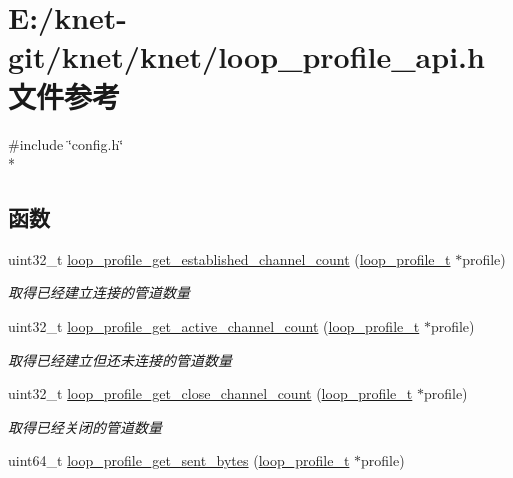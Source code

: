 \hypertarget{a00079}{}\section{E\+:/knet-\/git/knet/knet/loop\+\_\+profile\+\_\+api.h 文件参考}
\label{a00079}
{\ttfamily \#include \char`\"{}config.\+h\char`\"{}}\\*
\subsection*{函数}
\begin{DoxyCompactItemize}
\item 
uint32\+\_\+t \hyperlink{a00079_a45226aca5f27c8d49cc7b405409fc958_a45226aca5f27c8d49cc7b405409fc958}{loop\+\_\+profile\+\_\+get\+\_\+established\+\_\+channel\+\_\+count} (\hyperlink{a00050_ad060e1396346d2f5db1ec0597376a107_ad060e1396346d2f5db1ec0597376a107}{loop\+\_\+profile\+\_\+t} $\ast$profile)
\begin{DoxyCompactList}\small\item\em 取得已经建立连接的管道数量 \end{DoxyCompactList}\item 
uint32\+\_\+t \hyperlink{a00079_a25e7659843c550c5d2147286ad1b48ae_a25e7659843c550c5d2147286ad1b48ae}{loop\+\_\+profile\+\_\+get\+\_\+active\+\_\+channel\+\_\+count} (\hyperlink{a00050_ad060e1396346d2f5db1ec0597376a107_ad060e1396346d2f5db1ec0597376a107}{loop\+\_\+profile\+\_\+t} $\ast$profile)
\begin{DoxyCompactList}\small\item\em 取得已经建立但还未连接的管道数量 \end{DoxyCompactList}\item 
uint32\+\_\+t \hyperlink{a00079_a5fd58f572ac680a32930d275c5854e8e_a5fd58f572ac680a32930d275c5854e8e}{loop\+\_\+profile\+\_\+get\+\_\+close\+\_\+channel\+\_\+count} (\hyperlink{a00050_ad060e1396346d2f5db1ec0597376a107_ad060e1396346d2f5db1ec0597376a107}{loop\+\_\+profile\+\_\+t} $\ast$profile)
\begin{DoxyCompactList}\small\item\em 取得已经关闭的管道数量 \end{DoxyCompactList}\item 
uint64\+\_\+t \hyperlink{a00079_ad8eec173abe7c0e50137b6ac74c2c817_ad8eec173abe7c0e50137b6ac74c2c817}{loop\+\_\+profile\+\_\+get\+\_\+sent\+\_\+bytes} (\hyperlink{a00050_ad060e1396346d2f5db1ec0597376a107_ad060e1396346d2f5db1ec0597376a107}{loop\+\_\+profile\+\_\+t} $\ast$profile)

\end{DoxyCompactItemize}

